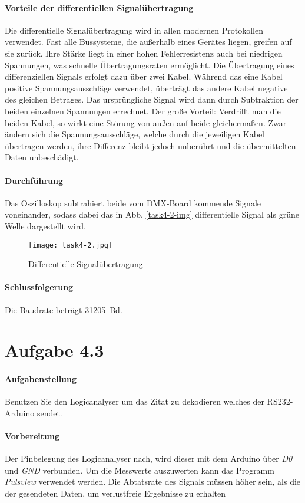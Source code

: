 \paragraph{Vorteile der differentiellen Signalübertragung}
Die differentielle Signalübertragung wird in allen modernen Protokollen verwendet. Fast alle Bussysteme, die außerhalb eines Gerätes liegen, greifen auf sie zurück. Ihre Stärke liegt in einer hohen Fehlerresistenz auch bei niedrigen Spannungen, was schnelle Übertragungsraten ermöglicht. Die Übertragung eines differenziellen Signals erfolgt dazu über zwei Kabel. Während das eine Kabel positive Spannungsausschläge verwendet, überträgt das andere Kabel negative des gleichen Betrages. Das ursprüngliche Signal wird dann durch Subtraktion der beiden einzelnen Spannungen errechnet. Der große Vorteil: Verdrillt man die beiden Kabel, so wirkt eine Störung von außen auf beide gleichermaßen. Zwar ändern sich die Spannungsausschläge, welche durch die jeweiligen Kabel übertragen werden, ihre Differenz bleibt jedoch unberührt und die übermittelten Daten unbeschädigt.

\paragraph{Durchführung}
Das Oszilloskop subtrahiert beide vom DMX-Board kommende Signale voneinander, sodass dabei das in Abb. \vref{task4-2-img} differentielle Signal als grüne Welle dargestellt wird.

\begin{figure}[!h]
	\centering
	\texttt{[image: task4-2.jpg]}
	\caption{Differentielle Signalübertragung}
	\label{task4-2-img}
\end{figure}

\paragraph{Schlussfolgerung}
Die Baudrate beträgt \SI{31205}{Bd}.

\section{Aufgabe 4.3}
\paragraph{Aufgabenstellung}
Benutzen Sie den Logicanalyser um das Zitat zu dekodieren welches der RS232-Arduino sendet.

\paragraph{Vorbereitung}
Der Pinbelegung des Logicanalyser nach, wird dieser mit dem Arduino über \textit{D0} und \textit{GND} verbunden. Um die Messwerte auszuwerten kann das Programm \textit{Pulsview} verwendet werden. Die Abtatsrate des Signals müssen höher sein, als die der gesendeten Daten, um verlustfreie Ergebnisse zu erhalten

